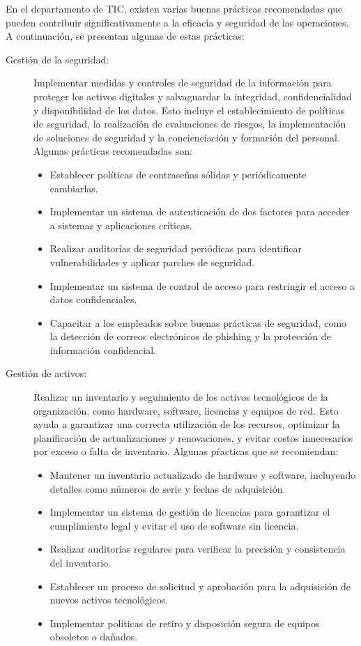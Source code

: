 \documentclass{article}
\begin{document}
En el departamento de TIC, existen varias buenas prácticas recomendadas que pueden contribuir significativamente a la eficacia y seguridad de las operaciones. A continuación, se presentan algunas de estas prácticas:
\begin{description}
    \item[Gestión de la seguridad:] Implementar medidas y controles de seguridad de la información para proteger los activos digitales y salvaguardar la integridad, confidencialidad y disponibilidad de los datos. Esto incluye el establecimiento de políticas de seguridad, la realización de evaluaciones de riesgos, la implementación de soluciones de seguridad y la concienciación y formación del personal. Algunas prácticas recomendadas son:
    \begin{itemize}[label=$\circ$]
        \item Establecer políticas de contraseñas sólidas y periódicamente cambiarlas.
        \item Implementar un sistema de autenticación de dos factores para acceder a sistemas y aplicaciones críticas.
        \item Realizar auditorías de seguridad periódicas para identificar vulnerabilidades y aplicar parches de seguridad.
        \item Implementar un sistema de control de acceso para restringir el acceso a datos confidenciales.
        \item Capacitar a los empleados sobre buenas prácticas de seguridad, como la detección de correos electrónicos de phishing y la protección de información confidencial.
    \end{itemize}
    
    \item[Gestión de activos:] Realizar un inventario y seguimiento de los activos tecnológicos de la organización, como hardware, software, licencias y equipos de red. Esto ayuda a garantizar una correcta utilización de los recursos, optimizar la planificación de actualizaciones y renovaciones, y evitar costos innecesarios por exceso o falta de inventario. Algunas pŕacticas que se recomiendan:
    \begin{itemize}[label=$\circ$]
        \item Mantener un inventario actualizado de hardware y software, incluyendo detalles como números de serie y fechas de adquisición.
        \item Implementar un sistema de gestión de licencias para garantizar el cumplimiento legal y evitar el uso de software sin licencia.
        \item Realizar auditorías regulares para verificar la precisión y consistencia del inventario.
        \item Establecer un proceso de solicitud y aprobación para la adquisición de nuevos activos tecnológicos.
        \item Implementar políticas de retiro y disposición segura de equipos obsoletos o dañados.
    \end{itemize}
    

\end{description}
\end{document}

